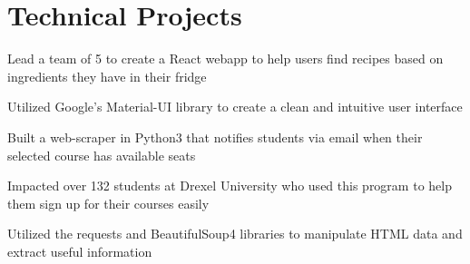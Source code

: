 \documentclass[]{deedy-resume-openfont}
\begin{document}
\begin{minipage}[t]{0.66\textwidth}

    
    
    
    \section{Technical Projects}
    \sectionsep

    \begin{tightemize}
        \item Lead a team of 5 to create a React webapp to help users find recipes based on ingredients they have in their fridge
        \item Utilized Google's Material-UI library to create a clean and intuitive user interface
    \end{tightemize}
    \begin{tightemize}
        \item Built a web-scraper in Python3 that notifies students via email when their selected course has available seats
        \item Impacted over 132 students at Drexel University who used this program to help them sign up for their courses easily
        \item Utilized the requests and BeautifulSoup4 libraries to manipulate HTML data and extract useful information
    \end{tightemize}
    \sectionsep



\end{minipage}
\end{document}
